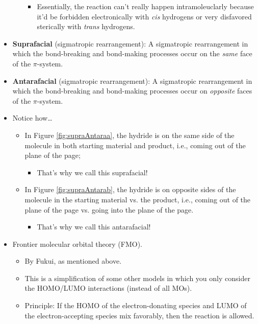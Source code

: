 \documentclass[../notes.tex]{subfiles}
\begin{document}
\begin{itemize}
\begin{itemize}
\begin{itemize}
            \item Essentially, the reaction can't really happen intramoleuclarly because it'd be forbidden electronically with \emph{cis} hydrogens or very disfavored sterically with \emph{trans} hydrogens.
        \end{itemize}
    \end{itemize}
    \item \textbf{Suprafacial} (sigmatropic rearrangement): A sigmatropic rearrangement in which the bond-breaking and bond-making processes occur on the \emph{same} face of the $\pi$-system.
    \item \textbf{Antarafacial} (sigmatropic rearrangement): A sigmatropic rearrangement in which the bond-breaking and bond-making processes occur on \emph{opposite} faces of the $\pi$-system.
    \item Notice how\dots
    \begin{itemize}
        \item In Figure \ref{fig:supraAntaraa}, the hydride is on the same side of the molecule in both starting material and product, i.e., coming out of the plane of the page;
        \begin{itemize}
            \item That's why we call this suprafacial!
        \end{itemize}
        \item In Figure \ref{fig:supraAntarab}, the hydride is on opposite sides of the molecule in the starting material vs. the product, i.e., coming out of the plane of the page vs. going into the plane of the page.
        \begin{itemize}
            \item That's why we call this antarafacial!
        \end{itemize}
    \end{itemize}
    \pagebreak
    \item Frontier molecular orbital theory (FMO).
    \begin{itemize}
        \item By Fukui, as mentioned above.
        \item This is a simplification of some other models in which you only consider the HOMO/LUMO interactions (instead of all MOs).
        \item Principle: If the HOMO of the electron-donating species and LUMO of the electron-accepting species mix favorably, then the reaction is allowed.
    \end{itemize}

\end{itemize}
\end{document}
